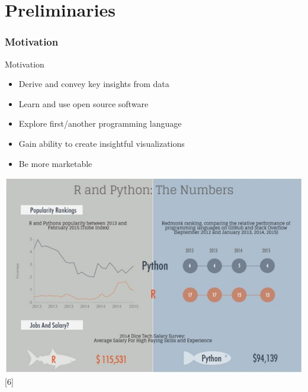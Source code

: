\part{Preliminaries}

\section{Motivation}
\normalfont
\begin{frame}
	\begin{center}
  		\begin{alertblock}{Motivation} 
  			\begin{itemize}
  				\item Derive and convey key insights from data
  				\item Learn and use open source software
  				\item Explore first/another programming language
  				\item Gain ability to create insightful visualizations
  				\item Be more marketable 
  			\end{itemize}
		\end{alertblock}

	       \begin{center}
	         \includegraphics[scale=0.25]{images/r-vs-python-numbers}[6]
	        \end{center}

	\end{center} 
\end{frame}



